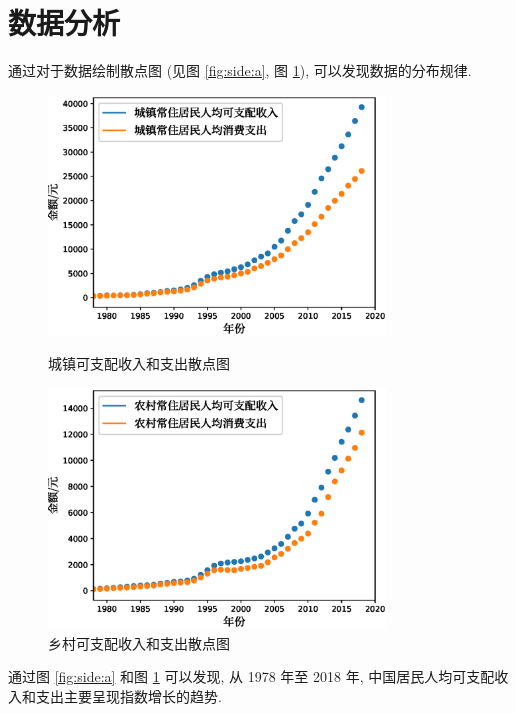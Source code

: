 \documentclass{article}
\begin{document}
\section{数据分析}\label{sec:analysis}
通过对于数据绘制散点图 (见图 \ref{fig:side:a}, 图 \ref{fig:side:b}), 可以发现数据的分布规律.\\
\begin{figure}[H]
  \centering
  \begin{minipage}[t]{0.48\textwidth}
    \centering
    \includegraphics[width=0.8\textwidth]{figures/plot2.eps}
    \caption{城镇可支配收入和支出散点图}
    \label{fig:side:a}
  \end{minipage}
  \begin{minipage}[t]{0.48\textwidth}
    \centering
    \includegraphics[width=0.8\textwidth]{figures/plot3.eps}
    \caption{乡村可支配收入和支出散点图}
    \label{fig:side:b}
  \end{minipage}
\end{figure}
\par 通过图 \ref{fig:side:a} 和图 \ref{fig:side:b} 可以发现, 从 1978 年至 2018 年, 中国居民人均可支配收入和支出主要呈现指数增长的趋势.\\
\end{document}
